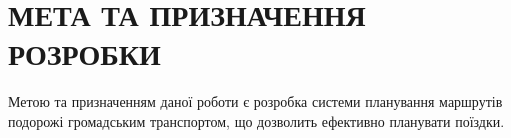 \begingroup
\renewcommand{\cleardoublepage}{}
\renewcommand{\clearpage}{}
\chapter{МЕТА ТА ПРИЗНАЧЕННЯ РОЗРОБКИ}
\endgroup

Метою та призначенням даної роботи є розробка системи планування маршрутів подорожі громадським транспортом, що дозволить ефективно планувати поїздки.

\bigskip
\bigskip
\bigskip
\bigskip